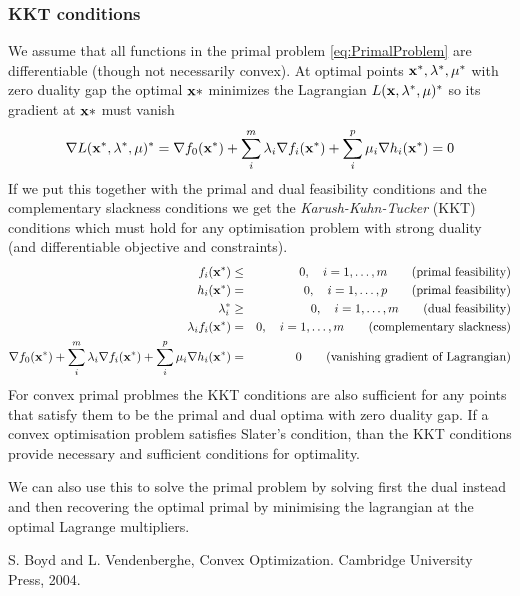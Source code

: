 \subsubsection{KKT conditions}\label{sec:KKTConditions}
We assume that all functions in the primal problem \eqref{eq:PrimalProblem} are differentiable (though not necessarily convex).
At optimal points $\mathbf{x}^*,\mathbf{\lambda}^*,\mathbf{\mu}^*$ with zero duality gap the optimal $\mathbf{x}*$ minimizes the Lagrangian $L(\mathbf{x},\mathbf{\lambda}^*,\mathbf{\mu})^*$ so its gradient at $\mathbf{x}*$ must vanish
\begin{equation}
 \nabla L(\mathbf{x}^*,\mathbf{\lambda}^*,\mathbf{\mu})^* 
= \nabla f_0(\mathbf{x}^*) 
+ \sum_i^m \lambda_i \nabla f_i(\mathbf{x}^*)
+ \sum_i^p \mu_i \nabla h_i(\mathbf{x}^*)
= 0
\end{equation}
If we put this together with the primal and dual feasibility conditions and the complementary slackness conditions we get the \emph{Karush-Kuhn-Tucker} (KKT) conditions which must hold for any optimisation problem with strong duality (and differentiable objective and constraints).
\begin{eqnarray}\label{eq:KKTConditions}
 f_i(\mathbf{x}^*) & \leq & 0, \quad i = 1,\ldots,m \qquad \text{(primal feasibility)} \nonumber \\
 h_i(\mathbf{x}^*) & = & 0, \quad i = 1,\ldots,p \qquad \text{(primal feasibility)} \nonumber \\
 \lambda_i^* & \geq & 0, \quad i = 1,\ldots,m \qquad \text{(dual feasibility)} \\
 \lambda_i f_i(\mathbf{x}^*) & = & 0, \quad i = 1,\ldots,m \qquad \text{(complementary slackness)} \nonumber \\
\nabla f_0(\mathbf{x}^*) 
+ \sum_i^m \lambda_i \nabla f_i(\mathbf{x}^*)
+ \sum_i^p \mu_i \nabla h_i(\mathbf{x}^*) 
& = & 0 \qquad \text{(vanishing gradient of Lagrangian)} \nonumber
\end{eqnarray}
For convex primal problmes the KKT conditions are also sufficient for any points that satisfy them to be the primal and dual optima with zero duality gap.
If a convex optimisation problem satisfies Slater's condition, than the KKT conditions provide necessary and sufficient conditions for optimality.

We can also use this to solve the primal problem by solving first the dual instead and then recovering the optimal primal by minimising the lagrangian at the optimal Lagrange multipliers.


\begin{thebibliography}{9}

S. Boyd and L. Vendenberghe, Convex Optimization. Cambridge University Press, 2004.

\end{thebibliography}